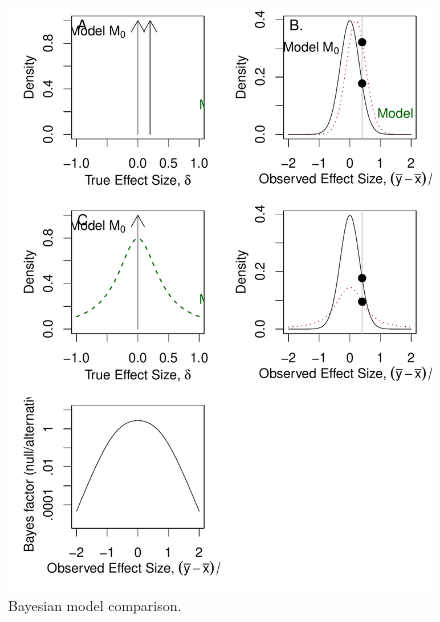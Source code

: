 \documentclass[man]{apa6}
\begin{document}
\begin{figure}
\includegraphics[width=\textwidth, keepaspectratio]{BFfigure.pdf}
\caption{Bayesian model comparison.}
\label{BFfig}
\end{figure}
\end{document}
